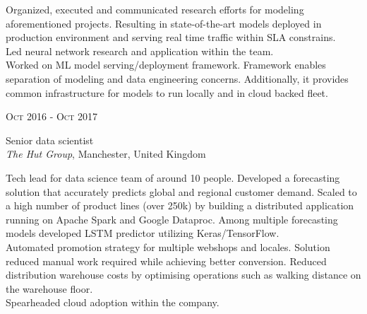 \documentclass[10pt]{article} %
\begin{document}
{\begin{minipage}[t]{0.5\textwidth}
{Organized, executed and communicated research efforts for 
modeling aforementioned projects. Resulting in state-of-the-art 
models deployed in production environment and serving real 
time traffic within SLA constrains.
\\

Led neural network research and application within the team.
\\

Worked on ML model serving/deployment framework. Framework 
enables separation of modeling and data engineering concerns. 
Additionally, it provides common infrastructure for models to 
run locally and in cloud backed fleet.
}\\



\vspace{0.5cm}
{\raggedleft\textsc{Oct 2016 - Oct 2017}\par}

{\raggedright\large Senior data scientist\\
\textit{The Hut Group}, Manchester, United Kingdom\\[5pt]}

\normalsize{Tech lead for data science team of around 10 people. 
Developed a forecasting solution that accurately predicts global 
and regional customer demand. Scaled to a high number of product 
lines (over 250k) by building a distributed application running 
on Apache Spark and Google Dataproc. Among multiple forecasting models 
developed LSTM predictor utilizing Keras/TensorFlow.
\\

Automated promotion strategy for multiple webshops and locales. 
Solution reduced manual work required while achieving better conversion.
Reduced distribution warehouse costs by optimising operations such 
as walking distance on the warehouse floor.
\\

Spearheaded cloud adoption within the company.}\\



\end{minipage} %
\hfill
\begin{minipage}[t]{0.44\textwidth} %
\vspace{0pt} %


\end{minipage}}
\end{document}
